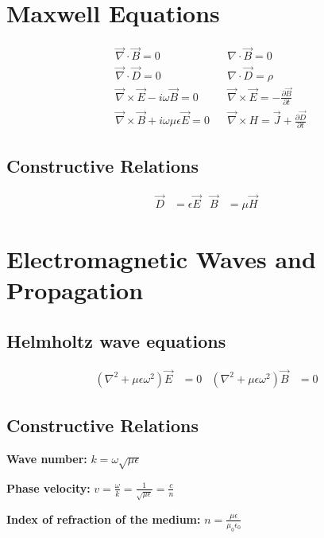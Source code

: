 \documentclass[a4paper, 11pt, landscape]{article}
\begin{document}
\begin{multicols*}{3}
\section{Maxwell Equations}
\begin{compactenum}

    \begin{align*}
    &\vec{\nabla} \cdot \vec{B} = 0 & &\nabla \cdot \vec{B} = 0 \\
    &\vec{\nabla} \cdot \vec{D} = 0 & &\nabla \cdot \vec{D} = \rho \\
    &\vec{\nabla} \times \vec{E} - i\omega\vec{B} = 0 & 
    &\vec{\nabla} \times \vec{E} = - \frac{\partial \vec{B}}{\partial t} \\
    &\vec{\nabla} \times \vec{B} + i\omega\mu\epsilon\vec{E} = 0 & 
    &\vec{\nabla} \times H = \vec{J} + \frac{\partial \vec{D}}{\partial t}
	\end{align*}

\end{compactenum}

\subsection{Constructive Relations}
\begin{compactenum}

	\begin{align*}
	\vec{D} &= \epsilon\vec{E} & \vec{B} &= \mu\vec{H}
	\end{align*}

\end{compactenum}

\section{Electromagnetic Waves and Propagation}
\subsection{Helmholtz wave equations}
\begin{compactenum}
\begin{align*}
(\nabla^{2} + \mu \epsilon \omega^{2})\vec{E} &= 0 & 
(\nabla^{2} + \mu \epsilon \omega^{2})\vec{B} &= 0 
\end{align*}
\end{compactenum}

\subsection{Constructive Relations}
\begin{compactenum}
    \item \textbf{Wave number:} $k = \omega\sqrt{\mu \epsilon}$
	\item \textbf{Phase velocity:} $v = \frac{\omega}{k} = \frac{1}{\sqrt{\mu \epsilon}} = \frac{c}{n}$ 
	\item \textbf{Index of refraction of the medium:} $n = \frac{\mu \epsilon}{\mu_{0} \epsilon_{0}}$
\end{compactenum}


\end{multicols*}
\end{document}
